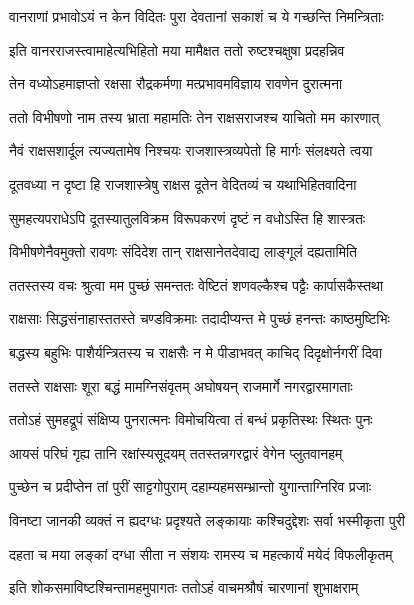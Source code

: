 \twolineshloka
{वानराणां प्रभावोऽयं न केन विदितः पुरा}
{देवतानां सकाशं च ये गच्छन्ति निमन्त्रिताः} %

\twolineshloka
{इति वानरराजस्त्वामाहेत्यभिहितो मया}
{मामैक्षत ततो रुष्टश्चक्षुषा प्रदहन्निव} %

\twolineshloka
{तेन वध्योऽहमाज्ञप्तो रक्षसा रौद्रकर्मणा}
{मत्प्रभावमविज्ञाय रावणेन दुरात्मना} %

\twolineshloka
{ततो विभीषणो नाम तस्य भ्राता महामतिः}
{तेन राक्षसराजश्च याचितो मम कारणात्} %

\twolineshloka
{नैवं राक्षसशार्दूल त्यज्यतामेष निश्चयः}
{राजशास्त्रव्यपेतो हि मार्गः संलक्ष्यते त्वया} %

\twolineshloka
{दूतवध्या न दृष्टा हि राजशास्त्रेषु राक्षस}
{दूतेन वेदितव्यं च यथाभिहितवादिना} %

\twolineshloka
{सुमहत्यपराधेऽपि दूतस्यातुलविक्रम}
{विरूपकरणं दृष्टं न वधोऽस्ति हि शास्त्रतः} %

\twolineshloka
{विभीषणेनैवमुक्तो रावणः संदिदेश तान्}
{राक्षसानेतदेवाद्य लाङ्गूलं दह्यतामिति} %

\twolineshloka
{ततस्तस्य वचः श्रुत्वा मम पुच्छं समन्ततः}
{वेष्टितं शणवल्कैश्च पट्टैः कार्पासकैस्तथा} %

\twolineshloka
{राक्षसाः सिद्धसंनाहास्ततस्ते चण्डविक्रमाः}
{तदादीप्यन्त मे पुच्छं हनन्तः काष्ठमुष्टिभिः} %

\twolineshloka
{बद्धस्य बहुभिः पाशैर्यन्त्रितस्य च राक्षसैः}
{न मे पीडाभवत् काचिद् दिदृक्षोर्नगरीं दिवा} %

\twolineshloka
{ततस्ते राक्षसाः शूरा बद्धं मामग्निसंवृतम्}
{अघोषयन् राजमार्गे नगरद्वारमागताः} %

\twolineshloka
{ततोऽहं सुमहद्रूपं संक्षिप्य पुनरात्मनः}
{विमोचयित्वा तं बन्धं प्रकृतिस्थः स्थितः पुनः} %

\twolineshloka
{आयसं परिघं गृह्य तानि रक्षांस्यसूदयम्}
{ततस्तन्नगरद्वारं वेगेन प्लुतवानहम्} %

\twolineshloka
{पुच्छेन च प्रदीप्तेन तां पुरीं साट्टगोपुराम्}
{दहाम्यहमसम्भ्रान्तो युगान्ताग्निरिव प्रजाः} %

\twolineshloka
{विनष्टा जानकी व्यक्तं न ह्यदग्धः प्रदृश्यते}
{लङ्कायाः कश्चिदुद्देशः सर्वा भस्मीकृता पुरी} %

\twolineshloka
{दहता च मया लङ्कां दग्धा सीता न संशयः}
{रामस्य च महत्कार्यं मयेदं विफलीकृतम्} %

\twolineshloka
{इति शोकसमाविष्टश्चिन्तामहमुपागतः}
{ततोऽहं वाचमश्रौषं चारणानां शुभाक्षराम्} %

